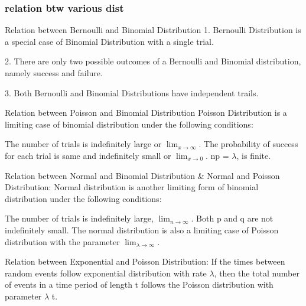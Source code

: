 \documentclass{beamer}
\begin{document}
\begin{frame}\frametitle{relation btw various dist}
	Relation between Bernoulli and Binomial Distribution
	1. Bernoulli Distribution is a special case of Binomial Distribution with a single trial.
	
	2. There are only two possible outcomes of a Bernoulli and Binomial distribution, namely success and failure.
	
	3. Both Bernoulli and Binomial Distributions have independent trails.
	
	
	
	Relation between Poisson and Binomial Distribution
	Poisson Distribution is a limiting case of binomial distribution under the following conditions:
	
	The number of trials is indefinitely large or $\displaystyle{\lim_{x \to \infty}}$.
	The probability of success for each trial is same and indefinitely small or $\displaystyle{\lim_{x \to 0}}$.
	np = $\lambda$, is finite.
	
	
	Relation between Normal and Binomial Distribution \& Normal and Poisson Distribution:
	Normal distribution is another limiting form of binomial distribution under the following conditions:
	
	The number of trials is indefinitely large, $\displaystyle{\lim_{n \to \infty}}$.
	Both p and q are not indefinitely small.
	The normal distribution is also a limiting case of Poisson distribution with the parameter $\displaystyle{\lim_{\lambda \to \infty}}$.
	
	
	
	Relation between Exponential and Poisson Distribution:
	If the times between random events follow exponential distribution with rate $\lambda$, then the total number of events in a time period of length t follows the Poisson distribution with parameter $\lambda$ t.
	
\end{frame}
\end{document}

